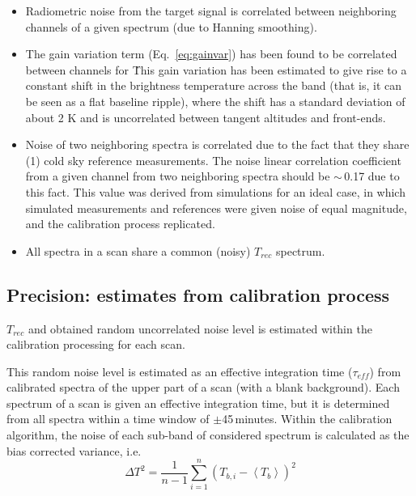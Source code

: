 \begin{itemize}

\item Radiometric noise from the target signal is correlated between 
neighboring channels of a given spectrum (due to Hanning smoothing).

\item The gain variation term (Eq.~\ref{eq:gainvar}) has been found to be correlated 
between channels for \smr\.
This gain variation has been estimated to give rise to a constant
shift in the brightness temperature across the band (that is, it can 
be seen as a flat baseline ripple), where the shift
has a standard deviation of about 2 K and is uncorrelated
between tangent altitudes and front-ends.

\item Noise of two neighboring spectra is correlated due to
the fact that they share (1) cold sky reference measurements. 
The noise linear correlation coefficient from a given channel
from two neighboring spectra should be \(\sim\)\,0.17 due to this
fact. This value was derived from simulations for an ideal
case, in which simulated measurements and references were 
given noise of equal magnitude, and the calibration
process replicated.

\item All spectra in a scan share a common (noisy) \(T_{rec}\)
spectrum. 

\end{itemize}

\subsection{Precision: estimates from calibration process}
\label{sec:caluncer}

\(T_{rec}\) and obtained random uncorrelated noise level is estimated within the 
calibration processing for each scan.


This random noise level is estimated as an effective integration time
(\(\tau_{eff}\)) from calibrated spectra of the upper part of a scan 
(with a blank background). Each spectrum of a scan is given an effective
integration time, but it is determined from all spectra within a time
window of \(\pm\)45\,minutes. 
Within the calibration algorithm, the noise of each sub-band of
considered spectrum is calculated as the bias corrected variance, i.e.
\begin{equation}
\Delta T^{2} = \frac{1}{n-1}\sum_{i=1}^{n}(T_{b,i}-\left<T_{b}\right>)^{2}
\end{equation}

